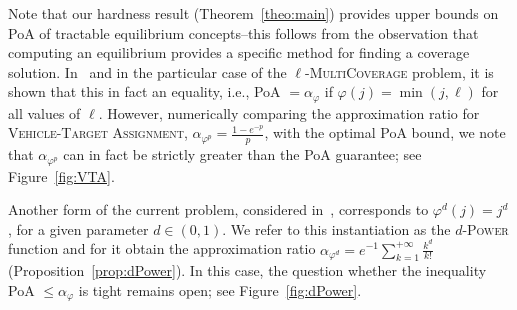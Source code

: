 Note that our hardness result (Theorem~\ref{theo:main}) provides upper bounds on PoA of tractable equilibrium concepts--this follows from the observation that computing an equilibrium provides a specific method for finding a coverage solution. In~\cite{CPM19} and in the particular case of the $\ell$-\textsc{MultiCoverage} problem, it is shown that this in fact an equality, i.e., PoA $=\alpha_{\varphi}$ if $\varphi(j) = \min(j,\ell)$ for all values of $\ell$. However, numerically comparing the approximation ratio for \textsc{Vehicle-Target Assignment}, $\alpha_{\varphi^p} = \frac{1 - e^{-p}}{p}$, with the optimal PoA bound, we note that $\alpha_{\varphi^p}$ can in fact be strictly greater than the PoA guarantee; see Figure~\ref{fig:VTA}.

Another form of the current problem, considered in~\cite{PM19}, corresponds to $\varphi^d(j) = j^d$, for a given parameter $d \in (0,1)$. We refer to this instantiation as the $d$-\textsc{Power} function and for it obtain the approximation ratio $\alpha_{\varphi^d} = e^{-1}\sum_{k=1}^{+\infty}\frac{k^d}{k!}$ (Proposition~\ref{prop:dPower}). In this case, the question whether the inequality PoA $\leq \alpha_{\varphi}$ is tight remains open; see Figure~\ref{fig:dPower}.

